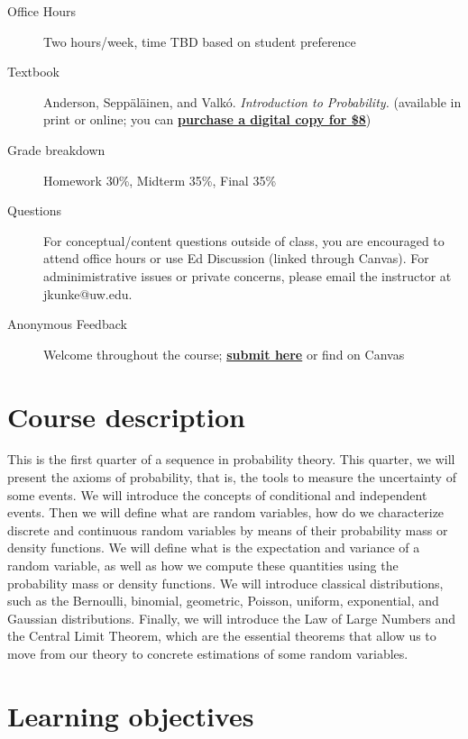 \documentclass{article}
\begin{document}
\begin{description}
\begin{itemize}
    \end{itemize}
    \item[{Office Hours}] Two hours/week, time TBD based on student preference
    \item[{Textbook}] Anderson, Seppäläinen, and
    Valkó. \emph{Introduction to Probability.} (available in print or online; you can \href{https://collegestudenttextbook.org/product/introduction-to-probability-ebook/}{\textbf{purchase a digital copy for \$8}})
    \item[{Grade breakdown}] Homework 30\%, Midterm 35\%, Final 35\%
    \item[{Questions}] For conceptual/content questions outside of class, you are encouraged to attend office hours or use Ed Discussion (linked through Canvas). For adminimistrative issues or private concerns, please email the instructor at jkunke@uw.edu.
    \item[{Anonymous Feedback}] Welcome throughout the course; \href{https://forms.gle/VMv2eQ1z7qkqdHJ69}{\textbf{submit here}} or find on Canvas
\end{description}

\section{Course description}

This is the first quarter of a sequence in probability theory. This quarter, we will present the axioms of probability, that is, the tools to measure the uncertainty of some events. We will introduce the concepts of conditional and independent events. Then we will define what are random variables, how do we characterize discrete and continuous random variables by means of their probability mass or density functions. We will define what is the expectation and variance of a random variable, as well as how we compute these quantities using the probability mass or density functions. We will introduce classical distributions, such as the Bernoulli, binomial, geometric, Poisson, uniform, exponential, and Gaussian distributions. Finally, we will introduce the Law of Large Numbers and the Central Limit Theorem, which are the essential theorems that allow us to move from our theory to concrete estimations of some random variables.

\section{Learning objectives}
\end{document}
